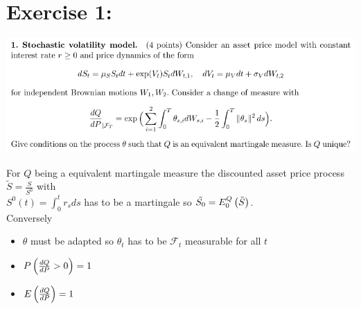 \documentclass[document.tex]{subfiles}
\begin{document}
\section*{Exercise 1:}

\includegraphics[width=\textwidth]{ex1.png}

For $Q$ being a equivalent martingale measure the discounted asset price process $\tilde{S} = \frac{S}{S^0}$ with \\ 
$S^0 (t) = \int_0^t r_s ds $  has to be a martingale so $\tilde{S_0}= E^Q_0 \left( \tilde{S} \right)$.\\
Conversely 
\begin{itemize}
	\item $\theta$ must be adapted so $\theta_t$ has to be  $\mathcal{F}_t$ measurable for all $t$ \\ 
	\item $P \left( \frac{dQ}{dP} > 0 \right) =1 $
	\item $E \left( \frac{dQ}{dP} \right) = 1$  
\end{itemize}
\end{document}
